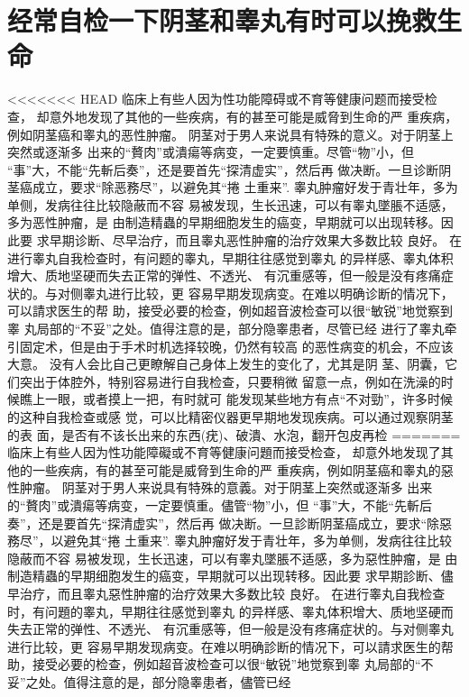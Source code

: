 \documentclass[12pt,UTF8]{ctexbook}
\begin{document}
\section{经常自检一下阴茎和睾丸有时可以挽救生命}

<<<<<<< HEAD
临床上有些人因为性功能障碍或不育等健康问题而接受检查，
却意外地发现了其他的一些疾病，有的甚至可能是威脅到生命的严
重疾病，例如阴茎癌和睾丸的恶性肿瘤。
阴茎对于男人来说具有特殊的意义。对于阴茎上突然或逐渐多
出来的“贅肉”或潰瘍等病变，一定要慎重。尽管“物”小，但
“事”大，不能“先斬后奏”，还是要首先“探清虚实”，然后再
做决断。一旦诊断阴茎癌成立，要求“除恶務尽”，以避免其“捲
土重来”.
睾丸肿瘤好发于青壮年，多为单侧，发病往往比较隐蔽而不容
易被发现，生长迅速，可以有睾丸墜脹不适感，多为恶性肿瘤，是
由制造精蟲的早期细胞发生的癌变，早期就可以出现转移。因此要
求早期诊断、尽早治疗，而且睾丸恶性肿瘤的治疗效果大多数比较
良好。
在进行睾丸自我检查时，有问题的睾丸，早期往往感觉到睾丸
的异样感、睾丸体积增大、质地坚硬而失去正常的弹性、不透光、
有沉重感等，但一般是没有疼痛症状的。与对侧睾丸进行比较，更
容易早期发现病变。在难以明确诊断的情况下，可以請求医生的帮
助，接受必要的检查，例如超音波检查可以很“敏锐”地觉察到睾
丸局部的“不妥”之处。值得注意的是，部分隐睾患者，尽管已经
进行了睾丸牵引固定术，但是由于手术时机选择较晚，仍然有较高
的恶性病变的机会，不应该大意。
没有人会比自己更瞭解自己身体上发生的变化了，尤其是阴
茎、阴囊，它们突出于体腔外，特别容易进行自我检查，只要稍微
留意一点，例如在洗澡的时候瞧上一眼，或者摸上一把，有时就可
能发现某些地方有点“不对勁”，许多时候的这种自我检查或感
觉，可以比精密仪器更早期地发现疾病。可以通过观察阴茎的表
面，是否有不该长出来的东西(疣)、破潰、水泡，翻开包皮再检
=======
临床上有些人因为性功能障礙或不育等健康问題而接受检查，
却意外地发现了其他的一些疾病，有的甚至可能是威脅到生命的严
重疾病，例如阴茎癌和睾丸的惡性肿瘤。
阴茎对于男人来说具有特殊的意義。对于阴茎上突然或逐渐多
出来的“贅肉”或潰瘍等病变，一定要慎重。儘管“物”小，但
“事”大，不能“先斬后奏”，还是要首先“探清虚实”，然后再
做决断。一旦診断阴茎癌成立，要求“除惡務尽”，以避免其“捲
土重来”.
睾丸肿瘤好发于青壮年，多为单侧，发病往往比较隐蔽而不容
易被发现，生长迅速，可以有睾丸墜脹不适感，多为惡性肿瘤，是
由制造精蟲的早期细胞发生的癌变，早期就可以出现转移。因此要
求早期診断、儘早治疗，而且睾丸惡性肿瘤的治疗效果大多数比较
良好。
在进行睾丸自我检查时，有问題的睾丸，早期往往感觉到睾丸
的异样感、睾丸体积增大、质地坚硬而失去正常的弹性、不透光、
有沉重感等，但一般是没有疼痛症状的。与对侧睾丸进行比较，更
容易早期发现病变。在难以明确診断的情况下，可以請求医生的帮
助，接受必要的检查，例如超音波检查可以很“敏锐”地觉察到睾
丸局部的“不妥”之处。值得注意的是，部分隐睾患者，儘管已经
\end{document}
